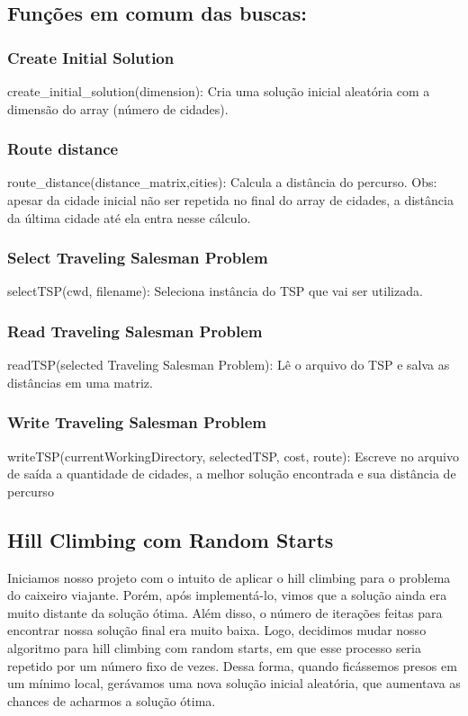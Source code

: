 \documentclass[a4paper,12 pts]{article}
\begin{document}
	\subsection{Funções em comum das buscas:}
		\subsubsection{Create Initial Solution}
			create\_initial\_solution(dimension): Cria uma solução inicial aleatória com a dimensão do array (número de cidades).
		\subsubsection{Route distance}
			route\_distance(distance\_matrix,cities): Calcula a distância do percurso. Obs: apesar da cidade inicial não ser repetida no final do array de cidades, a distância da última cidade até ela entra nesse cálculo.
		\subsubsection{Select Traveling Salesman Problem}
			selectTSP(cwd, filename): Seleciona instância do TSP que vai ser utilizada.
		\subsubsection{Read Traveling Salesman Problem}
			readTSP(selected Traveling Salesman Problem): Lê o arquivo do TSP e salva as distâncias em uma matriz.
		\subsubsection{Write Traveling Salesman Problem}
			writeTSP(currentWorkingDirectory, selectedTSP, cost, route): Escreve no arquivo de saída a quantidade de cidades, a melhor solução encontrada e sua distância de percurso
	
	\subsection{Hill Climbing com Random Starts}
		Iniciamos nosso projeto com o intuito de aplicar o hill climbing para o problema do caixeiro viajante. Porém, após implementá-lo, vimos que a solução ainda era muito distante da solução ótima. Além disso, o número de iterações feitas para encontrar nossa solução final era muito baixa. Logo, decidimos mudar nosso algoritmo para hill climbing com random starts, em que esse processo seria repetido por um número fixo de vezes. Dessa forma, quando ficássemos presos em um mínimo local, gerávamos uma nova solução inicial aleatória, que aumentava as chances de acharmos a solução ótima.
\end{document}
